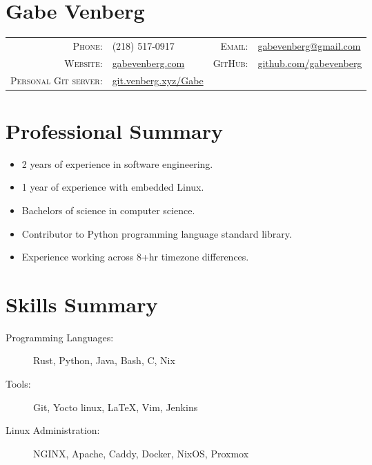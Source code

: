 \documentclass[letterpaper,10pt]{article}
\begin{document}
\pagestyle{empty}%
\section*{Gabe Venberg}
    \begin{tabular}{r l r l}
    \textsc{Phone:} & (218) 517-0917 &
    \textsc{Email:} & \href{mailto:gabevenberg@gmail.com}{gabevenberg@gmail.com}\\
    \textsc{Website:} & \href{https://gabevenberg.com}{gabevenberg.com} &
    \textsc{GitHub:} & \href{https://github.com/gabevenberg}{github.com/gabevenberg}\\
    \textsc{Personal Git server:} & \href{https://git.venberg.xyz/Gabe}{git.venberg.xyz/Gabe} &
    \end{tabular}
\section*{Professional Summary}

\begin{itemize}
    \item 2 years of experience in software engineering.
    \item 1 year of experience with embedded Linux.
    \item Bachelors of science in computer science.
    \item Contributor to Python programming language standard library.
    \item Experience working across 8+hr timezone differences.
\end{itemize}

\section*{Skills Summary}

\begin{description}
    \item[Programming Languages:] Rust, Python, Java, Bash, C, Nix
    \item[Tools:] Git, Yocto linux, \LaTeX{}, Vim, Jenkins
    \item[Linux Administration:] NGINX, Apache, Caddy, Docker, NixOS, Proxmox
\end{description}
\end{document}
